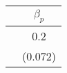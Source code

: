 \begin{table}[ht]
\centering
\begin{tabular}{cc}
  \hline
 & $\beta_{p}$ \\ 
  \hline
 & 0.2 \\ 
   & (0.072) \\ 
   \hline
\end{tabular}
\end{table}
